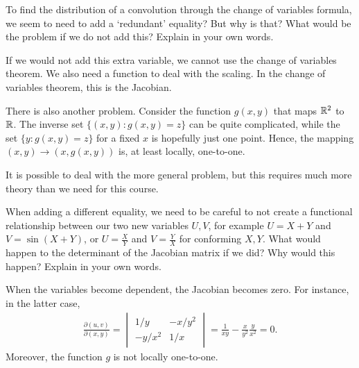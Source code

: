 \documentclass[assignments]{subfiles}
\begin{document}
\begin{exercise}
To find the distribution of a convolution through the change of variables formula, we seem to need to add a `redundant' equality?
But why is that?
What would be the problem if we do not add this?
Explain in your own words.
\begin{solution}
If we would not add this extra variable, we cannot use the change of variables theorem. We also need a function to deal with the scaling. In the change of variables theorem, this is the Jacobian.

There is also another problem.
Consider the function $g(x, y)$ that maps $\mathbb{R}^{2}$ to $\mathbb{R}$.
The inverse set $\{ (x,y) : g(x,y) =z \}$ can be quite complicated, while the set $\{y : g(x, y) = z\}$ for a fixed $x$ is hopefully just one point.
Hence, the mapping $(x, y) \to (x, g(x,y))$ is, at least locally, one-to-one.

It is possible to deal with the more general problem, but this requires much more theory than we need for this course.
\end{solution}
\end{exercise}

\begin{exercise}
When adding a different equality, we need to be careful to not create a functional relationship between our two new variables $U,V$, for example $U=X+Y$ and $V=\sin(X+Y)$, or $U=\frac X Y$ and $V = \frac Y X$ for conforming $X,Y$.
What would happen to the determinant of the Jacobian matrix if we did?
Why would this happen?
Explain in your own words.
\begin{solution}
  When the variables become dependent, the Jacobian becomes zero. For instance,  in the latter case,
\begin{align}
\frac{\partial (u,v)}{\partial (x, y)} =
  \begin{vmatrix}
    1/y & -x/y^{2} \\
-y/x^{2} & 1/x
  \end{vmatrix} = \frac{1}{x y} - \frac{x}{y^2}\frac{y}{x^{2}} = 0.
\end{align}
Moreover, the function $g$ is not locally one-to-one.

\end{solution}
\end{exercise}
\end{document}
